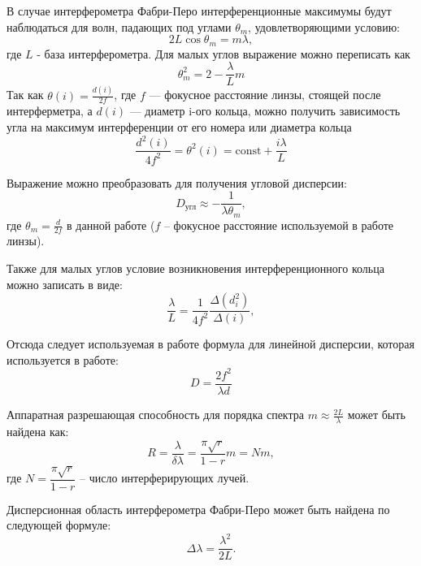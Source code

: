 \documentclass[a4paper]{article}
\begin{document}
В случае интерферометра Фабри-Перо интерференционные
максимумы будут наблюдаться для волн, падающих под углами $\theta_{m}$, удовлетворяющими
условию:
\begin{equation}\label{max_inter}
    2L\cos{\theta_{m}} = m\lambda,
\end{equation}
где $L$ - база интерферометра. Для малых углов выражение можно переписать как 
\begin{equation}
\label{eq:1}
\theta_m^2 = 2 - \frac{\lambda}{L}m
\end{equation}
Так как  $\theta(i) = \frac{d(i)}{2f}$, где $f$ --- фокусное расстояние линзы, стоящей после интерферметра, а $d(i)$ --- диаметр i-ого кольца, можно
получить зависимость угла на максимум интерференции от его номера или диаметра кольца 
\begin{equation}
\label{eq:2}
\frac{d^2(i)}{4f^2} = \theta^2(i) = \text{const} + \frac{i\lambda}{L}
\end{equation}

Выражение можно преобразовать для получения угловой дисперсии:
\begin{equation}
    D_{\text{угл}} \approx -\frac{1}{\lambda \theta_{m}},
\end{equation}
где $\theta_{m} = \frac{d}{2f}$ в данной работе ($f$ -- фокусное расстояние используемой в работе линзы).

Также для малых углов условие возникновения  интерференционного кольца можно записать в виде:
\begin{equation}
    \frac{\lambda}{L} = \frac{1}{4f^2}\frac{\Delta(d^2_i)}{\Delta(i)},
\end{equation}

Отсюда следует используемая в работе формула для линейной дисперсии, которая используется в работе:
\begin{equation}
    D = \frac{2f^{2}}{\lambda d}
\end{equation}

Аппаратная разрешающая способность для порядка спектра $m \approx \frac{2L}{\lambda}$ может быть найдена как:
\begin{equation}
    R = \frac{\lambda}{\delta \lambda} = \frac{\pi \sqrt{r}}{1 - r}m = Nm,
\end{equation}
где $N = \dfrac{\pi \sqrt{r}}{1 - r}$ -- число интерферирующих лучей.

Дисперсионная область интерферометра Фабри-Перо может быть найдена по следующей формуле:
\begin{equation}
    \Delta \lambda = \frac{\lambda^{2}}{2L}.
\end{equation}
\end{document}
